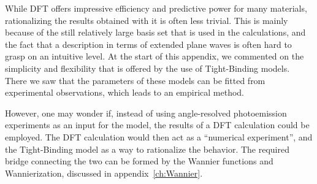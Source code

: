 While DFT offers impressive efficiency and predictive power for many materials, rationalizing the results obtained with it is often less trivial.
This is mainly because of the still relatively large basis set that is used in the calculations, and the fact that a description in terms of extended plane waves is often hard to grasp on an intuitive level.
At the start of this appendix, we commented on the simplicity and flexibility that is offered by the use of Tight-Binding models.
There we saw that the parameters of these models can be fitted from experimental observations, which leads to an empirical method.

However, one may wonder if, instead of using angle-resolved photoemission experiments as an input for the model, the results of a DFT calculation could be employed.
The DFT calculation would then act as a ``numerical experiment'', and the Tight-Binding model as a way to rationalize the behavior.
The required bridge connecting the two can be formed by the Wannier functions and Wannierization, discussed in appendix~\ref{ch:Wannier}. 
